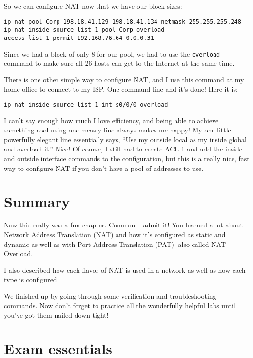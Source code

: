 So we can configure NAT now that we have our block sizes:

\begin{verbatim}
ip nat pool Corp 198.18.41.129 198.18.41.134 netmask 255.255.255.248
ip nat inside source list 1 pool Corp overload
access-list 1 permit 192.168.76.64 0.0.0.31
\end{verbatim}

Since we had a block of only 8 for our pool, we had to use the
\texttt{overload} command to make sure all 26 hosts can get to the
Internet at the same time.

There is one other simple way to configure NAT, and I use this command
at my home office to connect to my ISP. One command line and it's done!
Here it is:

\begin{verbatim}
ip nat inside source list 1 int s0/0/0 overload
\end{verbatim}

I can't say enough how much I love efficiency, and being able to achieve
something cool using one measly line always makes me happy! My one
little powerfully elegant line essentially says, ``Use my outside local
as my inside global and overload it.'' Nice! Of course, I still had to
create ACL 1 and add the inside and outside interface commands to the
configuration, but this is a really nice, fast way to configure NAT if
you don't have a pool of addresses to use.



\section{Summary}

Now this really was a fun chapter. Come on -- admit it! You learned a lot
about Network Address Translation (NAT) and how it's configured as
static and dynamic as well as with Port Address Translation (PAT), also
called NAT Overload.

I also described how each flavor of NAT is used in a network as well as
how each type is configured.

We finished up by going through some verification and troubleshooting
commands. Now don't forget to practice all the wonderfully helpful labs
until you've got them nailed down tight!



\section{Exam essentials}

